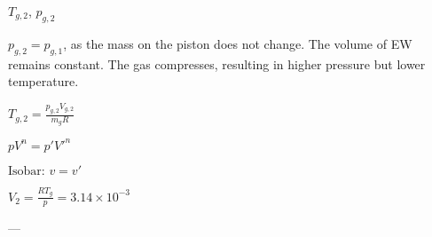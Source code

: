 \( T_{g,2} \), \( p_{g,2} \)  

\( p_{g,2} = p_{g,1} \), as the mass on the piston does not change. The volume of EW remains constant. The gas compresses, resulting in higher pressure but lower temperature.  

\( T_{g,2} = \frac{p_{g,2} V_{g,2}}{m_g R} \)  

\( p V^n = p' V'^n \)  

\( \text{Isobar: } v = v' \)  

\( V_2 = \frac{R T_g}{p} = 3.14 \times 10^{-3} \)  

---